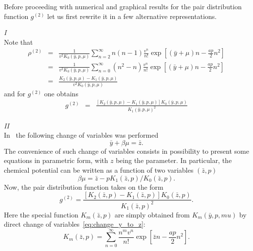 Before proceeding with numerical and graphical results for the pair distribution function $g^{(2)}$ let us first rewrite it in a few alternative representations.

{\it I}\\
Note that
\begin{eqnarray*}
	\rho^{(2)} & = & \frac{1}{v^2 K_0(\bar{y}, p, \mu)} \sum_{n=2}^{\infty} n(n-1) \frac{v^n}{n!} \exp\left[(\bar{y} + \mu)n - \frac{a p}{2} n^2\right]
	\\
	& = & \frac{1}{v^2 K_0(\bar{y}, p, \mu)} \sum_{n=0}^{\infty} (n^2 - n) \frac{v^n}{n!} \exp\left[(\bar{y} + \mu)n - \frac{a p}{2} n^2\right]
	\\
	& = & \frac{K_2(\bar{y}, p, \mu) - K_1(\bar{y}, p, \mu)}{v^2 K_0(\bar{y}, p, \mu)}
\end{eqnarray*}
and for $g^{(2)}$ one obtains
\begin{eqnarray}
	g^{(2)} & = & \frac{\left[K_2(\bar{y}, p, \mu) - K_1(\bar{y}, p, \mu)\right] K_0(\bar{y}, p, \mu)}{K_1(\bar{y}, p, \mu)^2}
\end{eqnarray}

{\it II}\\
In~\cite{KozlovskiiDobush2022} the following change of variables was performed
\begin{equation}
	\label{eq:change_y_to_z}
	\bar{y} + \beta\mu = \bar{z}.
\end{equation}
The convenience of such change of variables consists in possibility to present some equations in parametric form, with $z$ being the parameter. In particular, the chemical potential can be written as a function of two variables $(\bar{z}, p)$
\begin{equation*}
	\beta\mu = \bar{z} - p K_1(\bar{z},p)/K_0(\bar{z},p).
\end{equation*}
Now, the pair distribution function takes on the form
\begin{equation}
	g^{(2)} = \frac{\left[K_2(\bar{z}, p) - K_1(\bar{z}, p)\right] K_0(\bar{z}, p)}{K_1(\bar{z}, p)^2}.
\end{equation}
Here the special function $K_m(\bar{z}, p)$ are simply obtained from $K_m(\bar{y}, p, mu)$ by direct change of variables~\eqref{eq:change_y_to_z}:
\begin{equation*}
	K_m(\bar{z},p) = \sum_{n=0}^{\infty} \frac{n^m v^n}{n!} \exp[\bar{z}n - \frac{a p}{2}n^2].
\end{equation*}

